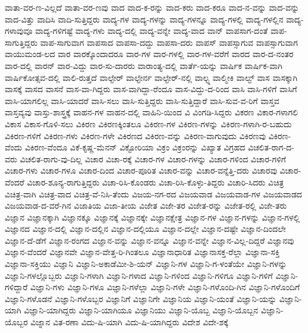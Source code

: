 {ವಾತಾ-ವರ-ಣ-ವಿಲ್ಲದೆ
ವಾತಾ-ವರ-ಣವು
ವಾದ
ವಾದ-ಕ-ರನ್ನು
ವಾದ-ಕರು
ವಾದ-ಕರೂ
ವಾದ-ನ-ವನ್ನು
ವಾದ-ವನ್ನು
ವಾದ-ವಿತ್ತು
ವಾದಿಸಿ
ವಾದಿ-ಸುತ್ತಿದ್ದರು
ವಾದ್ಯ-ಗಳ
ವಾದ್ಯ-ಗಳನ್ನು
ವಾದ್ಯ-ಗಳನ್ನೂ
ವಾದ್ಯ-ಗಳಲ್ಲಿ
ವಾದ್ಯ-ಗಳಲ್ಲಿನ
ವಾದ್ಯ-ಗಳಾವುವೂ
ವಾದ್ಯ-ಗಳಿಗಷ್ಟೆ
ವಾದ್ಯ-ಗಳು
ವಾದ್ಯ-ದಲ್ಲಿ
ವಾದ್ಯ-ವನ್ನೇ
ವಾದ್ಯ-ವಾದ
ವಾನ್
ವಾಪಸಾಗ-ದಂತೆ
ವಾಪ-ಸಾಗುತ್ತಿದ್ದರು
ವಾಪ-ಸಾಗುವಾಗ
ವಾಪಸಾದ
ವಾಪಸಾ-ದದ್ದು
ವಾಪಸಾ-ದರು
ವಾಪಸ್
ವಾಪಸ್ಸಾಗುವ
ವಾಪಸ್ಸಾಗುವಾಗ
ವಾಯುಮಂಡ-ಲದ
ವಾರ
ವಾರಕ್ಕೊಂದಾದರೂ
ವಾರ-ಗಳ
ವಾರ-ಗಳಲ್ಲಿ
ವಾರ-ಗಳ-ವರೆಗೆ
ವಾರದ
ವಾರ-ದ-ನಂತರ
ವಾರ-ದಲ್ಲಿ
ವಾರನ್
ವಾರ-ವಿದ್ದು
ವಾರ-ಸು-ದಾರರು
ವಾರಾಂತ್ಯ-ದಲ್ಲಿ
ವಾರ್ತೆ-ಯನ್ನು
ವಾರ್ಷಿಕ
ವಾರ್ಷಿಕ-ವಾಗಿ
ವಾರ್ಷಿಕೋತ್ಸವ-ದಲ್ಲಿ
ವಾಲಿ-ರುತ್ತದೆ
ವಾಲ್ಟೇರ್
ವಾಲ್ಟೇರ್ನ
ವಾಲ್ಟೇರ್-ನಲ್ಲಿ
ವಾಲ್ಟ್ನ
ವಾಲ್ಮೀಕಿ
ವಾಲ್ವ್
ವಾಸ
ವಾಸಕ್ಕಾಗಿ
ವಾಸಕ್ಕೆ
ವಾಸದ
ವಾಸನೆ
ವಾಸ-ವಾ-ಗಿದ್ದರು
ವಾಸ-ವಾಗಿದ್ದಾ-ರೆಂದೂ
ವಾಸ-ವಿದ್ದು-ದ-ರಿಂದ
ವಾಸಿ
ವಾಸಿ-ಗಳಿಗೆ
ವಾಸಿಗೆ
ವಾಸಿ-ಯಾಗಲಿಲ್ಲ
ವಾಸಿ-ಯಾದರೆ
ವಾಸಿ-ಸಲು
ವಾಸಿ-ಸುತ್ತಿದ್ದರು
ವಾಸಿ-ಸುತ್ತಿದ್ದಾರೆ
ವಾಸಿ-ಸುವ-ವ-ರಿಗೆ
ವಾಸ್ತವ
ವಾಸ್ತವ್ಯವು
ವಾಸ್ತು-ಶಾಸ್ತ್ರಕ್ಕೆ
ವಾಹನ-ಗಳ
ವಾಹನ-ದಲ್ಲಿ
ವಾಹಿನಿ-ಯಿಂದ
ವಿ
ವಿಂಗಡಿ-ಸಿದ್ದರು
ವಿಕರಣ
ವಿಕಾರ-ಗಳಾಗಲಿ
ವಿಕಾಸ
ವಿಕಾಸ-ಗೊಳಿ-ಸಲು
ವಿಕಿರಣ
ವಿಕಿರಣಕ್ಕಿಂತಲೂ
ವಿಕಿರಣ-ಗಳ
ವಿಕಿರಣ-ಗಳನ್ನು
ವಿಕಿರಣ-ಗಳಾಗಿ-ರ-ಬಹುದು
ವಿಕಿರಣ-ಗಳಿಗೆ
ವಿಕಿರಣ-ಗಳು
ವಿಕಿರಣ-ಗಳೇ
ವಿಕಿರಣದ
ವಿಕಿರಣ-ವನ್ನು
ವಿಕಿರಣ-ವಾಗುವುದು
ವಿಕಿರಣವು
ವಿಕಿರಣ-ವೆಂದು
ವಿಕಿರಣ-ವೆಂದೂ
ವಿಕೆ-ಕೃಷ್ಣ-ಮೆನನ್
ವಿಕ್ಟೋರಿಯಾ
ವಿಕ್ರಂ
ವಿಕ್ರಂರನ್ನು
ವಿಖ್ಯಾತ
ವಿಗ್ರಹದ
ವಿಚಲಿತ-ರಾಗ-ದ-ವರು
ವಿಚಲಿತ-ರಾಗು-ವು-ದಿಲ್ಲ
ವಿಚಾರ
ವಿಚಾ-ರಕ್ಕೆ
ವಿಚಾರ-ಗಳ
ವಿಚಾರ-ಗಳನ್ನು
ವಿಚಾರ-ಗಳಿಂದ
ವಿಚಾರ-ಗಳಿಗೆ
ವಿಚಾರ-ಗಳು
ವಿಚಾರ-ಗಳೂ
ವಿಚಾರ-ದಿಂದ
ವಿಚಾರ-ಪೂರಿತ
ವಿಚಾರ-ವನ್ನು
ವಿಚಾರ-ವನ್ನೆತ್ತಿ-ದರು
ವಿಚಾರವು
ವಿಚಾರ-ವೆಂದರೆ
ವಿಚಾರ-ಶೂನ್ಯ-ರಾಗುತ್ತಿದ್ದರು
ವಿಚಾ-ರಿಸಿ-ಕೊಂಡರು
ವಿಚಾ-ರಿಸಿ-ಕೊಳ್ಳು-ತಿದ್ದರು
ವಿಚಾರಿ-ಸಿದರು
ವಿಚಿತ್ರ
ವಿಚಿತ್ರ-ವಾಗಿ
ವಿಚಿತ್ರ-ವಾದ
ವಿಚಿತ್ರ-ವೆ-ನಿಸಿ-ತೆಂದು
ವಿಜಯ-ನಗ-ರದ
ವಿಜಯವಾಡ
ವಿಜಯವಾಡ-ಗಳ
ವಿಜಯವಾಡದ
ವಿಜಯವಾಡ-ದ-ವರೆ-ಗಿನ
ವಿಜಾತಿಯ
ವಿಜಾ-ತೀಯ
ವಿಜೇತ
ವಿಜೇ-ತರ
ವಿಜೇತ-ರನ್ನು
ವಿಜೇತ-ರಲ್ಲಿ
ವಿಜೇ-ತರು
ವಿಜ್ಞಾನ
ವಿಜ್ಞಾನಕ್ಕಾಗಿ
ವಿಜ್ಞಾನಕ್ಕೂ
ವಿಜ್ಞಾನಕ್ಕೆ
ವಿಜ್ಞಾನಕ್ಕೇ
ವಿಜ್ಞಾನಕ್ಷೇತ್ರ
ವಿಜ್ಞಾನ-ಗಳ
ವಿಜ್ಞಾನ-ಗಳನ್ನು
ವಿಜ್ಞಾನ-ಗಳಲ್ಲಿ
ವಿಜ್ಞಾನದ
ವಿಜ್ಞಾನ-ದಲ್ಲಿ
ವಿಜ್ಞಾನ-ದಲ್ಲಿನ
ವಿಜ್ಞಾನ-ದಲ್ಲಿಯೂ
ವಿಜ್ಞಾನ-ದಲ್ಲೇ
ವಿಜ್ಞಾನ-ದಷ್ಟೇ
ವಿಜ್ಞಾನ-ದಿಂದಲೇ
ವಿಜ್ಞಾನ-ದೆ-ಡೆಗೆ
ವಿಜ್ಞಾನ-ರಂಗದ
ವಿಜ್ಞಾನ-ವನ್ನು
ವಿಜ್ಞಾನ-ವನ್ನೂ
ವಿಜ್ಞಾನ-ವನ್ನೇ
ವಿಜ್ಞಾನ-ವಿಲ್ಲ-ದಿದ್ದರೆ
ವಿಜ್ಞಾನವು
ವಿಜ್ಞಾನ-ವೆಂದರೆ
ವಿಜ್ಞಾನವೇ
ವಿಜ್ಞಾನ-ವೇತ್ತ-ರಿ-ಗಿಂತಲೂ
ವಿಜ್ಞಾನಾಧಾರಿತ
ವಿಜ್ಞಾನಾಸಕ್ತ-ರೆಲ್ಲಾ
ವಿಜ್ಞಾನಾ-ಸಕ್ತಿ
ವಿಜ್ಞಾನಾ-ಸಕ್ತಿಯು
ವಿಜ್ಞಾನಿ
ವಿಜ್ಞಾನಿ-ಅಕಾಡೆಮೀ-ಶಿ-ಯನ್
ವಿಜ್ಞಾನಿ-ಗಳ
ವಿಜ್ಞಾನಿ-ಗ-ಳಂತೆಯೇ
ವಿಜ್ಞಾನಿ-ಗಳನ್ನು
ವಿಜ್ಞಾನಿ-ಗಳಲ್ಲೊಬ್ಬರು
ವಿಜ್ಞಾನಿ-ಗಳಾಗಿ
ವಿಜ್ಞಾನಿ-ಗಳಾದ
ವಿಜ್ಞಾನಿ-ಗಳಿಂದ
ವಿಜ್ಞಾನಿ-ಗಳಿಗೂ
ವಿಜ್ಞಾನಿ-ಗಳಿಗೆ
ವಿಜ್ಞಾನಿ-ಗಳಿದ್ದಾರೆ
ವಿಜ್ಞಾನಿ-ಗಳು
ವಿಜ್ಞಾನಿ-ಗಳೂ
ವಿಜ್ಞಾನಿ-ಗಳೆಲ್ಲಾ
ವಿಜ್ಞಾನಿ-ಗಳೇ
ವಿಜ್ಞಾನಿ-ಗಳೊಂದಿ-ಗಿನ
ವಿಜ್ಞಾನಿ-ಗಳೊಂದಿಗೆ
ವಿಜ್ಞಾನಿ-ಗಳೊಡನೆ
ವಿಜ್ಞಾನಿ-ಗಳೊಬ್ಬರ
ವಿಜ್ಞಾನಿಗೆ
ವಿಜ್ಞಾನಿಗೇ
ವಿಜ್ಞಾನಿಯ
ವಿಜ್ಞಾನಿ-ಯಂತೆ
ವಿಜ್ಞಾನಿ-ಯನ್ನು
ವಿಜ್ಞಾನಿ-ಯಾಗಿ
ವಿಜ್ಞಾನಿ-ಯಾಗಿದ್ದರು
ವಿಜ್ಞಾನಿ-ಯಾಗಿಯೂ
ವಿಜ್ಞಾನಿಯು
ವಿಜ್ಞಾನಿ-ಯೊಬ್ಬ
ವಿಜ್ಞಾನಿ-ಯೊಬ್ಬನ
ವಿಜ್ಞಾನಿ-ಯೊಬ್ಬರ
ವಿಜ್ನಾನ
ವಿತ-ರಣಾ
ವಿದು-ಷಿ-ಯಾಗಿ
ವಿದು-ಷಿ-ಯಾಗಿದ್ದರು
ವಿದೇಶ
ವಿದೇ-ಶಕ್ಕೆ
}
